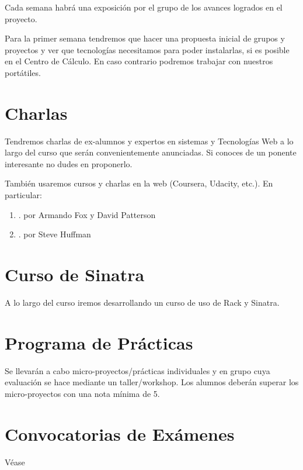 \documentclass[11pt,a4paper]{article}
\begin{document}
Cada semana habrá una exposición por el grupo de los avances logrados en el proyecto.

Para la primer semana tendremos que hacer una propuesta inicial de grupos y proyectos y ver que tecnologías necesitamos para poder instalarlas,
si es posible en el Centro de Cálculo. En caso contrario podremos trabajar con nuestros portátiles.

\section{Charlas}
Tendremos charlas de ex-alumnos y expertos en sistemas y Tecnologías Web a lo largo del curso que serán convenientemente anunciadas.
Si conoces de un ponente interesante no dudes en proponerlo.


También usaremos cursos y charlas en la web (Coursera, Udacity, etc.). En particular:
\begin{enumerate}
\item {}.  por Armando Fox y David Patterson
\item {}.  por Steve Huffman
\end{enumerate}

\section{Curso de Sinatra}
A lo largo del curso iremos desarrollando un curso de uso de Rack y Sinatra.

\section{Programa de Pr\'acticas}

Se llevarán a cabo micro-proyectos/prácticas individuales y en grupo cuya evaluación se hace mediante un 
taller/workshop. Los alumnos deberán superar los micro-proyectos con una nota mínima de 5. 

\section{Convocatorias de Exámenes}
Véase
\end{document}
